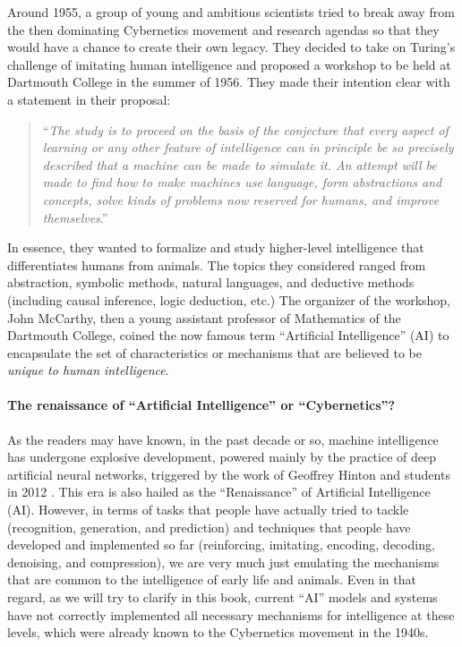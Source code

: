 \documentclass[../../book-main.tex]{subfiles}
\begin{document}
Around 1955, a group of young and ambitious scientists tried to break away from the then dominating Cybernetics movement and research agendas so that they would have a chance to create their own legacy. They decided to take on Turing's challenge of imitating human intelligence and proposed a workshop to be held at Dartmouth College in the summer of 1956. They made their intention clear with a statement in their proposal: 
\begin{quote}
    ``{\em The study is to proceed on the basis of the conjecture that every aspect of learning or any other feature of intelligence can in principle be so precisely described that a machine can be made to simulate it. An attempt will be made to find how to make machines use language, form abstractions and concepts, solve kinds of problems now reserved for humans, and improve themselves}.'' 
\end{quote}
In essence, they wanted to formalize and study higher-level intelligence that differentiates humans from animals. The topics they considered ranged from abstraction, symbolic methods, natural languages, and deductive methods (including causal inference, logic deduction, etc.) The organizer of the workshop, John McCarthy, then a young assistant professor of Mathematics of the Dartmouth College, coined the now famous term ``Artificial Intelligence'' (AI) to encapsulate the set of characteristics or mechanisms that are believed to be {\em unique to human intelligence}. 

\paragraph{The renaissance of ``Artificial Intelligence'' or ``Cybernetics''?}
As the readers may have known, in the past decade or so, machine intelligence has undergone explosive development, powered mainly by the practice of deep artificial neural networks, triggered by the work of Geoffrey Hinton and students in 2012 \cite{krizhevsky2012imagenet}. This era is also hailed as the ``Renaissance'' of Artificial Intelligence (AI). However, in terms of tasks that people have actually tried to tackle (recognition, generation, and prediction) and techniques that people have developed and implemented so far (reinforcing, imitating, encoding, decoding, denoising, and compression), we are very much just emulating the mechanisms that are common to the intelligence of early life and animals. Even in that regard, as we will try to clarify in this book, current ``AI'' models and systems have not correctly implemented all necessary mechanisms for intelligence at these levels, which were already known to the Cybernetics movement in the 1940s. 
\end{document}

